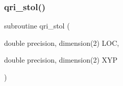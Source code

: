 \mbox{\label{qri__init_8f_accf819b4c65f65f7a02b0e843c293f4a}} 
\subsubsection{\texorpdfstring{qri\+\_\+stol()}{qri\_stol()}}
{\footnotesize\ttfamily subroutine qri\+\_\+stol (\begin{DoxyParamCaption}\item[{double precision, dimension(2)}]{L\+OC,  }\item[{double precision, dimension(2)}]{X\+YP }\end{DoxyParamCaption})}

